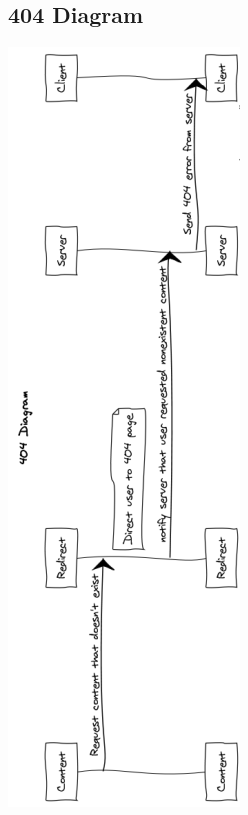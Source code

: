 \documentclass[12pt]{article}
\begin{document}
\subsection{404 Diagram}
\includegraphics[width = \textwidth]{dia404.PNG}
\end{document}
